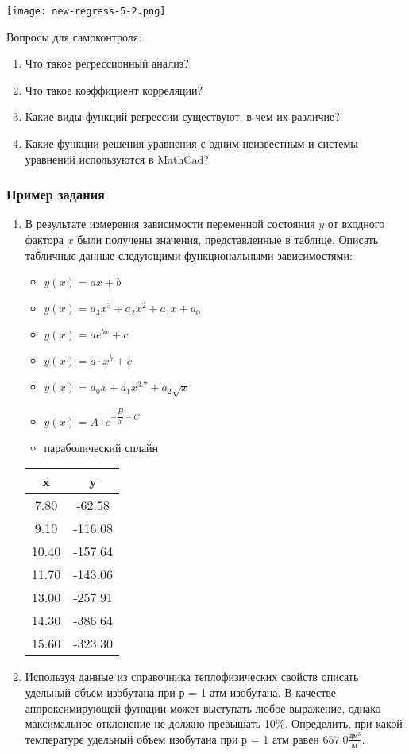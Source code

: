 \begin{center}
	\texttt{[image: new-regress-5-2.png]}
\end{center}

Вопросы для самоконтроля:
\begin{enumerate}
	\item Что такое регрессионный анализ?
	\item Что такое коэффициент корреляции?
	\item Какие виды функций регрессии существуют, в чем их различие?
	\item Какие функции решения уравнения с одним неизвестным и системы уравнений используются в MathCad?
\end{enumerate}

\subsubsection*{Пример задания}
\begin{enumerate}
\item В результате измерения зависимости переменной состояния $y$ от входного фактора $x$ были получены значения, представленные в таблице. Описать табличные данные следующими функциональными зависимостями:
\begin{itemize} 
	\item $y(x)=a x+b$
	\item $y(x)=a_3 x^3 +a_2 x^2 + a_1 x +a_0$
	\item $y(x)=a e^{b x}+c  $
	\item $y(x)=a \cdot x^b+c$
	\item $y(x)=a_0 x                     +a_1 x^{3.7}                +a_2 \sqrt{x}              $
	\item $y(x)=A \cdot e^{-\dfrac{B}{x}+C}        $
	\item параболический сплайн
\end{itemize}
\begin{table}[h]
	\begin{tabular}{|c|c|}
		\hline
		x & y \\ \hline
		7.80 &     -62.58 \\ \hline 
		9.10 &    -116.08 \\ \hline 
		10.40 &    -157.64 \\ \hline 
		11.70 &    -143.06 \\ \hline 
		13.00 &    -257.91 \\ \hline 
		14.30 &    -386.64 \\ \hline 
		15.60 &    -323.30 \\ \hline 
	\end{tabular}
\end{table}

\item  Используя данные из справочника теплофизических свойств \cite{vargaftik} описать удельный объем изобутана при р = 1 атм изобутана. В качестве аппроксимирующей функции может выступать любое выражение, однако максимальное отклонение не должно превышать 10\%. Определить, при какой температуре удельный объем изобутана при р = 1 атм равен $   657.0 \frac {\text{дм}^3}{\text{кг}}$.
\end{enumerate}